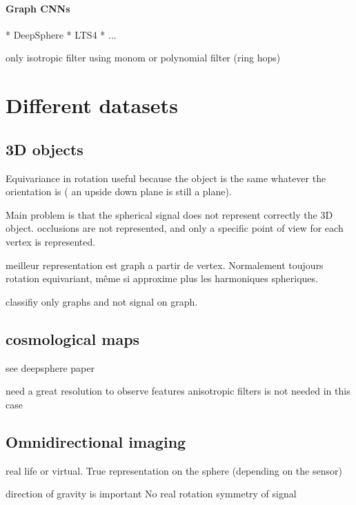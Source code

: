 \documentclass[11pt]{report}
\begin{document}
\subsubsection{Graph CNNs}
* DeepSphere \cite{perraudin_deepsphere:_2018}
* LTS4 \cite{frossard_graph-based_2017}
* ...

only isotropic filter using monom or polynomial filter (ring hops)


\chapter{Different datasets}\label{chap:Datasets}
\section{3D objects}
Equivariance in rotation useful because the object is the same whatever the orientation is ( an upside down plane is still a plane).

Main problem is that the spherical signal does not represent correctly the 3D object. occlusions are not represented, and only a specific point of view for each vertex is represented.

meilleur representation est graph a partir de vertex. Normalement toujours rotation equivariant, même si approxime plus les harmoniques spheriques.

classifiy only graphs and not signal on graph.

\section{cosmological maps}
see deepsphere paper

need a great resolution to observe features
anisotropic filters is not needed in this case

\section{Omnidirectional imaging}
real life or virtual.
True representation on the sphere (depending on the sensor)

direction of gravity is important
No real rotation symmetry of signal
\end{document}
